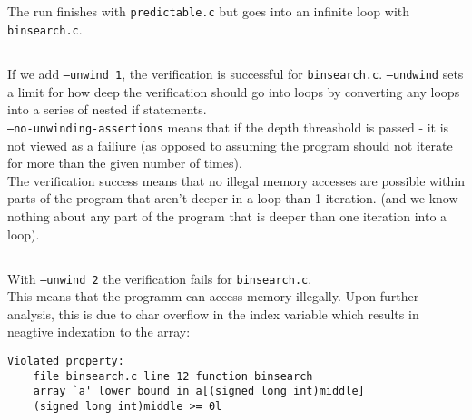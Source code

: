 \documentclass{article}
\begin{document}
\subsection{}
The run finishes with \texttt{predictable.c}
but goes into an infinite loop with \texttt{binsearch.c}.

\subsection{}
If we add \texttt{--unwind 1},
the verification is successful for \texttt{binsearch.c}.
\texttt{--undwind} sets a limit
for how deep the verification should go into loops by
converting any loops into a series of nested if statements.\\
\texttt{--no-unwinding-assertions} means
that if the depth threashold is passed - 
it is not viewed as a failiure (as opposed to assuming the
program should not iterate for more than the given number of times).\\
The verification success means that no illegal memory accesses are possible within parts of the program that aren't deeper in a loop
than 1 iteration. (and we know nothing about
any part of the program that is deeper than one iteration into a loop).

\subsection{}
With \texttt{--unwind 2} the verification fails for \texttt{binsearch.c}.\\
This means that the programm can access memory illegally.
Upon further analysis, this is due to char overflow in the index variable
which results in neagtive indexation to the array:
\begin{verbatim}
Violated property:
    file binsearch.c line 12 function binsearch
    array `a' lower bound in a[(signed long int)middle]
    (signed long int)middle >= 0l
\end{verbatim}
\end{document}
